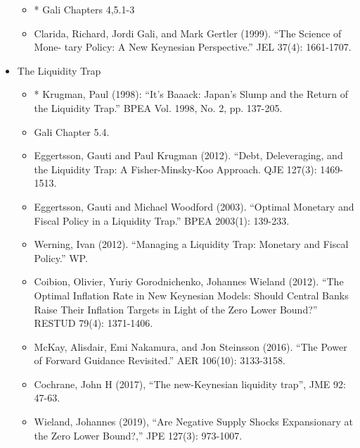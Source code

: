 \documentclass[12pt]{article}
\begin{document}
\begin{itemize}
	\begin{itemize}
		\item* Gali Chapters 4,5.1-3
		\item Clarida, Richard, Jordi Gali, and Mark Gertler (1999). ``The Science of Mone-
tary Policy: A New Keynesian Perspective.'' JEL 37(4): 1661-1707.
	\end{itemize}
	\item The Liquidity Trap
	\begin{itemize}
		\item* Krugman, Paul (1998): ``It's Baaack: Japan's Slump and the Return of the Liquidity Trap.'' BPEA Vol. 1998, No. 2, pp. 137-205.
		\item Gali Chapter 5.4.
		\item Eggertsson, Gauti and Paul Krugman (2012). ``Debt, Deleveraging, and the Liquidity Trap: A Fisher-Minsky-Koo Approach. QJE 127(3): 1469-1513.
		\item Eggertsson, Gauti and Michael Woodford (2003). ``Optimal Monetary and Fiscal
Policy in a Liquidity Trap.'' BPEA 2003(1): 139-233.
	 	\item Werning, Ivan (2012). ``Managing a Liquidity Trap: Monetary and Fiscal Policy.'' WP.
	 	\item Coibion, Olivier, Yuriy Gorodnichenko, Johannes Wieland (2012). ``The Optimal Inflation Rate in New Keynesian Models: Should Central Banks Raise Their Inflation Targets in Light of the Zero Lower Bound?'' RESTUD 79(4): 1371-1406.
	 	\item McKay, Alisdair, Emi Nakamura, and Jon Steinsson (2016). ``The Power of Forward Guidance Revisited.'' AER 106(10): 3133-3158.
	 	\item Cochrane, John H (2017), ``The new-Keynesian liquidity trap'', JME 92: 47-63.
	 	\item Wieland, Johannes (2019), ``Are Negative Supply Shocks Expansionary at the Zero Lower Bound?,'' JPE 127(3): 973-1007.
	\end{itemize}

\end{itemize}
\end{document}
